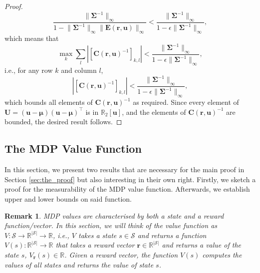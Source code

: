 \documentclass{mpaper}
\newtheorem{remark}[theorem]{Remark}
\newcommand{\V}{V_{\mathbf{r}}}
\begin{document}
\begin{proof}
\[    \frac{\lVert \bm\Sigma^{-1} \rVert_\infty}{1 - \lVert \bm\Sigma^{-1}
      \rVert_\infty \lVert \mathbf{E}(\mathbf{r}, \mathbf{u}) \rVert_\infty} <
    \frac{\lVert \bm\Sigma^{-1} \rVert_\infty}{1 - \epsilon \lVert
      \bm\Sigma^{-1} \rVert_\infty},
  \]
  which means that
  \[
    \max_k \sum_l \left| [\mathbf{C}(\mathbf{r}, \mathbf{u})^{-1}]_{k,l} \right|
    < \frac{\lVert \bm\Sigma^{-1} \rVert_\infty}{1 - \epsilon \lVert
      \bm\Sigma^{-1} \rVert_\infty},
  \]
  i.e., for any row $k$ and column $l$,
  \[
    \left| [\mathbf{C}(\mathbf{r}, \mathbf{u})^{-1}]_{k,l} \right| <
    \frac{\lVert \bm\Sigma^{-1} \rVert_\infty}{1 - \epsilon \lVert
      \bm\Sigma^{-1} \rVert_\infty},
  \]
  which bounds all elements of $\mathbf{C}(\mathbf{r}, \mathbf{u})^{-1}$ as
  required. Since every element of $\mathbf{U} = (\mathbf{u} - \bm\mu)(\mathbf{u} -
  \bm\mu)^\intercal$ is in $\mathbb{R}_2[\mathbf{u}]$, and the elements of
  $\mathbf{C}(\mathbf{r}, \mathbf{u})^{-1}$ are bounded, the desired result
  follows.
\end{proof}

\subsection{The MDP Value Function} \label{sec:propositions}

In this section, we present two results that are necessary for the main proof in
Section \ref{sec:the_proof} but also interesting in their own right. Firstly, we
sketch a proof for the measurability of the MDP value function. Afterwards, we
establish upper and lower bounds on said function.

\begin{remark}
  MDP values are characterised by both a state and a reward function/vector. In
  this section, we will think of the value function as $V \colon \mathcal{S} \to
  \mathbb{R}^{|\mathcal{S}|} \to \mathbb{R}$, i.e., $V$ takes a state $s \in
  \mathcal{S}$ and returns a function $V(s) \colon \mathbb{R}^{|\mathcal{S}|}
  \to \mathbb{R}$ that takes a reward vector $\mathbf{r} \in
  \mathbb{R}^{|\mathcal{S}|}$ and returns a value of the state $s$, $\V(s) \in
  \mathbb{R}$. Given a reward vector, the function $V(s)$ computes the values of
  all states and returns the value of state $s$.
\end{remark}
\end{document}
